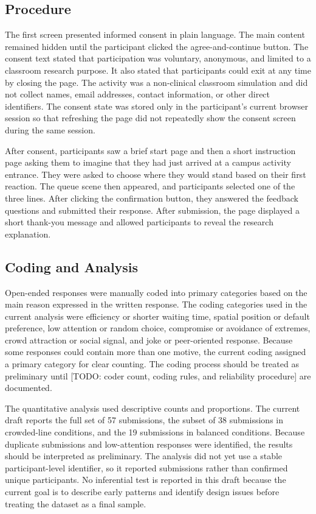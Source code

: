 \documentclass[stu,12pt,floatsintext]{apa7}
\begin{document}
\subsection{Procedure}

The first screen presented informed consent in plain language. The main content remained hidden until the participant clicked the agree-and-continue button. The consent text stated that participation was voluntary, anonymous, and limited to a classroom research purpose. It also stated that participants could exit at any time by closing the page. The activity was a non-clinical classroom simulation and did not collect names, email addresses, contact information, or other direct identifiers. The consent state was stored only in the participant's current browser session so that refreshing the page did not repeatedly show the consent screen during the same session.

After consent, participants saw a brief start page and then a short instruction page asking them to imagine that they had just arrived at a campus activity entrance. They were asked to choose where they would stand based on their first reaction. The queue scene then appeared, and participants selected one of the three lines. After clicking the confirmation button, they answered the feedback questions and submitted their response. After submission, the page displayed a short thank-you message and allowed participants to reveal the research explanation.

\subsection{Coding and Analysis}

Open-ended responses were manually coded into primary categories based on the main reason expressed in the written response. The coding categories used in the current analysis were efficiency or shorter waiting time, spatial position or default preference, low attention or random choice, compromise or avoidance of extremes, crowd attraction or social signal, and joke or peer-oriented response. Because some responses could contain more than one motive, the current coding assigned a primary category for clear counting. The coding process should be treated as preliminary until [TODO: coder count, coding rules, and reliability procedure] are documented.

The quantitative analysis used descriptive counts and proportions. The current draft reports the full set of 57 submissions, the subset of 38 submissions in crowded-line conditions, and the 19 submissions in balanced conditions. Because duplicate submissions and low-attention responses were identified, the results should be interpreted as preliminary. The analysis did not yet use a stable participant-level identifier, so it reported submissions rather than confirmed unique participants. No inferential test is reported in this draft because the current goal is to describe early patterns and identify design issues before treating the dataset as a final sample.
\end{document}
